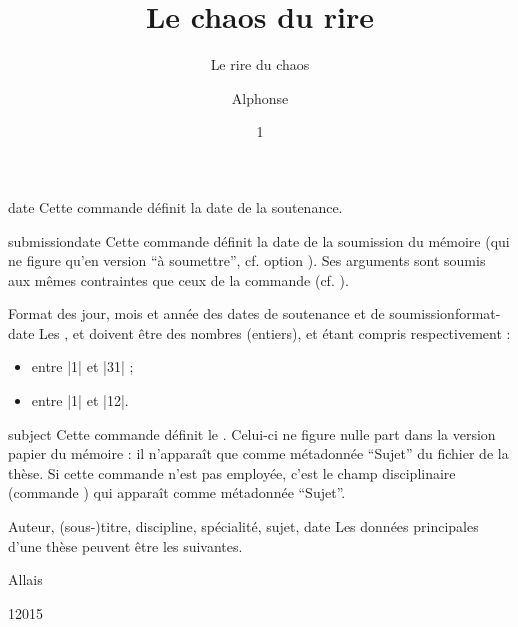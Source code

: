 %
\begin{docCommand}[doc description=\mandatory]{date}{}
  Cette commande définit la date de la soutenance.
\end{docCommand}
%
\begin{docCommand}{submissiondate}{}
  Cette commande définit la date de la soumission du mémoire (qui ne figure
  qu'en version \enquote{à soumettre}, cf. option 
  ). Ses arguments sont soumis aux mêmes contraintes que ceux
  de la commande  (cf. ).
\end{docCommand}
%
\begin{dbwarning}{Format des jour, mois et année des dates de
    soutenance et de soumission}{format-date}
  Les ,  et  doivent être des nombres
  (entiers),  et  étant compris respectivement :
  \begin{itemize}
  \item entre |1| et |31| ;
  \item entre |1| et |12|.
  \end{itemize}
\end{dbwarning}
%
\begin{docCommand}{subject}{}
  Cette commande définit le .  Celui-ci ne figure nulle
  part dans la version papier du mémoire : il n'apparaît que comme métadonnée
  \enquote{Sujet} du fichier \pdf{} de la thèse. Si cette commande n'est pas
  employée, c'est le champ disciplinaire (commande ) qui
  apparaît comme métadonnée \enquote{Sujet}.
\end{docCommand}

\begin{dbexample}{Auteur, (sous-)titre, discipline, spécialité, sujet, date}{}
  Les données principales d'une thèse peuvent être les suivantes.
  \NoAutoSpacing%
\begin{preamblecode}[title=Par exemple dans le \File{\characteristicsfile},listing options={deletekeywords={author,title,subtitle,date},deletekeywords={[2]title},deletekeywords={[5]academicfield,speciality}}]
\author[aa@zygo.fr]{Alphonse}{Allais}
\title[Laugh's Chaos]{Le chaos du rire}
\subtitle[Chaos' laugh]{Le rire du chaos}
\date{1}{1}{2015}
\subject{Rire chaotique}
\end{preamblecode}
\end{dbexample}

